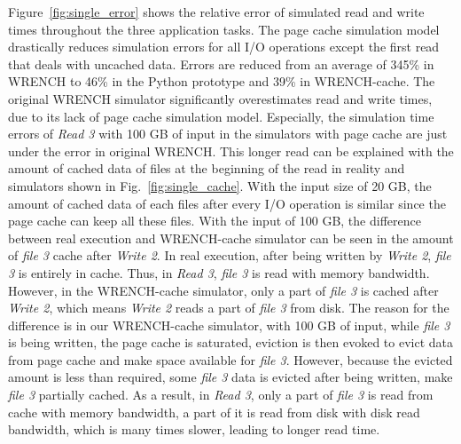 \documentclass[conference]{IEEEtran}
\newcommand{\tristan}[1]{\color{orange}\textbf{From Tristan:}#1\color{black}}
\begin{document}
             Figure~\ref{fig:single_error} shows the relative error of simulated
             read and write times throughout the three application tasks. The
             page cache simulation model drastically reduces simulation errors
             for all I/O operations except the first read that deals with
             uncached data. Errors are reduced from an average of 345\%
             in WRENCH to 46\% in the Python prototype and 39\% in WRENCH-cache.
             The original WRENCH simulator significantly overestimates
             read and write times, due to its lack of page cache simulation
             model.
             Especially, the simulation time errors of \textit{Read 3} with 100 GB of input
             in the simulators with page cache are just under the error in original WRENCH.
             This longer read can be explained with the amount of cached data of files
             at the beginning of the read in reality and simulators shown in
             Fig.~\ref{fig:single_cache}.
             With the input size of 20 GB, the amount of cached data of each files after 
             every I/O operation is similar since the page cache can keep all these files.
             With the input of 100 GB, the difference between real execution and WRENCH-cache
             simulator can be seen in the amount of \textit{file 3} cache after \textit{Write 2}.
             In real execution, after being written by \textit{Write 2},
             \textit{file 3} is entirely in cache.
             Thus, in \textit{Read 3}, \textit{file 3} is read with memory bandwidth.
             However, in the WRENCH-cache simulator, only a part of \textit{file 3} is
             cached after \textit{Write 2}, which means \textit{Write 2} reads a part of
             \textit{file 3} from disk.
             The reason for the difference is in our WRENCH-cache simulator,
             with 100 GB of input, while \textit{file 3} is being written,
             the page cache is saturated, eviction is then evoked to evict data
             from page cache and make space available for \textit{file 3}.
             However, because the evicted amount is less than required,
             some \textit{file 3} data is evicted after being written, make \textit{file 3}
             partially cached.
             As a result, in \textit{Read 3}, only a part of \textit{file 3} is read from cache
             with memory bandwidth, a part of it is read from disk with disk read bandwidth,
             which is many times slower, leading to longer read time.
\end{document}
